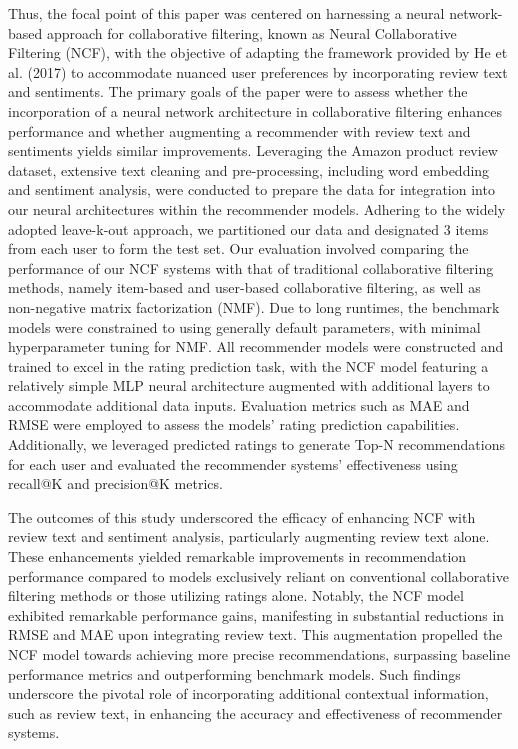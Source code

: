 Thus, the focal point of this paper was centered on harnessing a neural network-based approach for collaborative filtering, known as Neural Collaborative Filtering (NCF), with the objective of adapting the framework provided by He et al. (2017) to accommodate nuanced user preferences by incorporating review text and sentiments. The primary goals of the paper were to assess whether the incorporation of a neural network architecture in collaborative filtering enhances performance and whether augmenting a recommender with review text and sentiments yields similar improvements. Leveraging the Amazon product review dataset, extensive text cleaning and pre-processing, including word embedding and sentiment analysis, were conducted to prepare the data for integration into our neural architectures within the recommender models. Adhering to the widely adopted leave-k-out approach, we partitioned our data and designated 3 items from each user to form the test set. Our evaluation involved comparing the performance of our NCF systems with that of traditional collaborative filtering methods, namely item-based and user-based collaborative filtering, as well as non-negative matrix factorization (NMF). Due to long runtimes, the benchmark models were constrained to using generally default parameters, with minimal hyperparameter tuning for NMF. All recommender models were constructed and trained to excel in the rating prediction task, with the NCF model featuring a relatively simple MLP neural architecture augmented with additional layers to accommodate additional data inputs. Evaluation metrics such as MAE and RMSE were employed to assess the models' rating prediction capabilities. Additionally, we leveraged predicted ratings to generate Top-N recommendations for each user and evaluated the recommender systems' effectiveness using recall@K and precision@K metrics.


The outcomes of this study underscored the  efficacy of enhancing NCF with review text and sentiment analysis, particularly augmenting review text alone. These enhancements yielded remarkable improvements in recommendation performance compared to models exclusively reliant on conventional collaborative filtering methods or those utilizing ratings alone. Notably, the NCF model exhibited remarkable performance gains, manifesting in substantial reductions in RMSE and MAE upon integrating review text. This augmentation propelled the NCF model towards achieving more precise recommendations, surpassing baseline performance metrics and outperforming benchmark models. Such findings underscore the pivotal role of incorporating additional contextual information, such as review text, in enhancing the accuracy and effectiveness of recommender systems.

